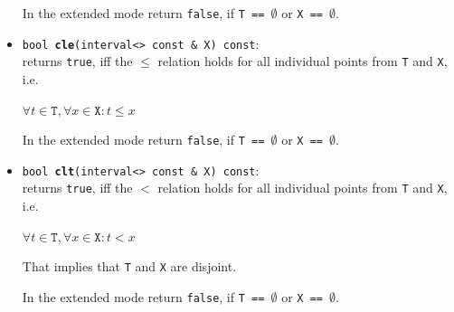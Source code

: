 \documentclass{report}
\begin{document}
\begin{itemize}
In the extended mode return \texttt{false}, if 
				\texttt{T == $\emptyset$} or \texttt{X == $\emptyset$}.
			\item \texttt{bool {\bf cle}(interval<> const \& X)
const}:\\returns  \texttt{true}, iff the $\leq$ relation holds for all individual
			points from \texttt{T} and \texttt{X}, i.e.
\begin{center} $\forall t \in \texttt{T},\forall x \in \texttt{X}  :
			t \leq x $\end{center}

In the extended mode return \texttt{false}, if 
				\texttt{T == $\emptyset$} or \texttt{X == $\emptyset$}.
			\item \texttt{bool {\bf clt}(interval<> const \& X)
			const}:\\ 
returns  \texttt{true}, iff the $<$ relation holds for all individual
			points from \texttt{T} and \texttt{X}, i.e.
\begin{center} $\forall t \in \texttt{T},\forall x \in \texttt{X}  :
			t < x $\end{center}
That implies that \texttt{T} and \texttt{X} are disjoint.

In the extended mode return \texttt{false}, if 
				\texttt{T == $\emptyset$} or \texttt{X == $\emptyset$}.
\end{itemize}
\end{document}

